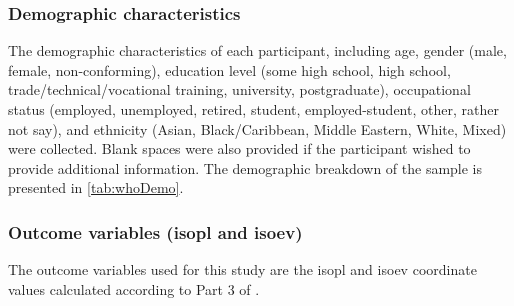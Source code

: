 \subsubsection*{Demographic characteristics}
The demographic characteristics of each participant, including age, gender (male, female, non-conforming), education level (some high school, high school, trade/technical/vocational training, university, postgraduate), occupational status (employed, unemployed, retired, student, employed-student, other, rather not say), and ethnicity (Asian, Black/Caribbean, Middle Eastern, White, Mixed) were collected. Blank spaces were also provided if the participant wished to provide additional information. The demographic breakdown of the sample is presented in \cref{tab:whoDemo}.

\subsubsection*{Outcome variables (\gls{isopl} and \gls{isoev})}
\label{sec:whoOutcomeVar}
The outcome variables used for this study are the \gls{isopl} and \gls{isoev} coordinate values calculated according to Part 3 of \citet{ISO12913Part3}.




